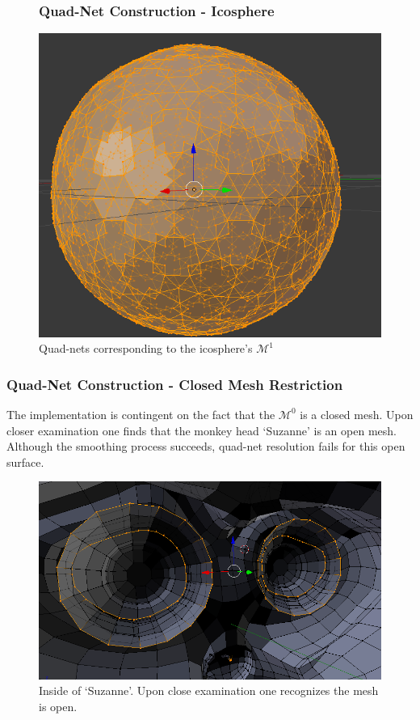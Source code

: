 \documentclass[11pt]{beamer}
\begin{document}
	\begin{frame}
		\begin{figure}[h]
			\frametitle{Quad-Net Construction - Icosphere}
			\centering
			\includegraphics[width=.75\linewidth]{img/quad_icosphere_2}
			\caption{Quad-nets corresponding to the icosphere's $\mathcal{M}^1$ }	
		\end{figure}
	\end{frame}

	\begin{frame}
		\frametitle{Quad-Net Construction - Closed Mesh Restriction}
		The implementation is contingent on the fact that the $\mathcal{M}^0$ is a closed mesh. Upon closer examination one finds that the monkey head `Suzanne' is an open mesh. Although the smoothing process succeeds, quad-net resolution fails for this open surface. \\
		\begin{figure}[h]
			\centering
			\includegraphics[width=.5\linewidth]{img/quad_monkey}
			\caption{Inside of `Suzanne'. Upon close examination one recognizes the mesh is open.}	
		\end{figure}
	\end{frame}
	
\end{document}
